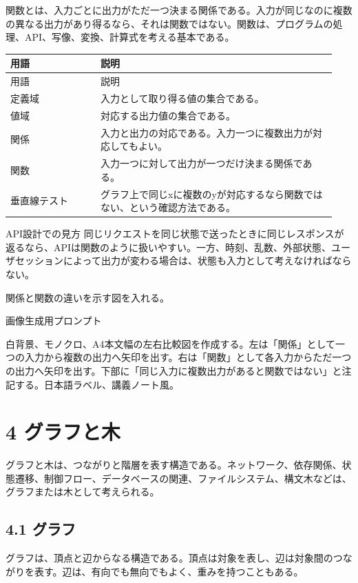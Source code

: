 \documentclass[uplatex,dvipdfmx,a4paper,10pt]{jsarticle}
\begin{document}
関数とは、入力ごとに出力がただ一つ決まる関係である。入力が同じなのに複数の異なる出力があり得るなら、それは関数ではない。関数は、プログラムの処理、API、写像、変換、計算式を考える基本である。

\begin{longtable}{>{\raggedright\arraybackslash}p{0.26\linewidth} >{\raggedright\arraybackslash}p{0.68\linewidth}}
\toprule
用語 & 説明 \\
\midrule
\endfirsthead
\toprule
用語 & 説明 \\
\midrule
\endhead
定義域 & 入力として取り得る値の集合である。 \\
値域 & 対応する出力値の集合である。 \\
関係 & 入力と出力の対応である。入力一つに複数出力が対応してもよい。 \\
関数 & 入力一つに対して出力が一つだけ決まる関係である。 \\
垂直線テスト & グラフ上で同じxに複数のyが対応するなら関数ではない、という確認方法である。 \\
\bottomrule
\end{longtable}
\begin{infobox}{API設計での見方}
同じリクエストを同じ状態で送ったときに同じレスポンスが返るなら、APIは関数のように扱いやすい。一方、時刻、乱数、外部状態、ユーザセッションによって出力が変わる場合は、状態も入力として考えなければならない。
\end{infobox}
\begin{todobox}
関係と関数の違いを示す図を入れる。

画像生成用プロンプト

白背景、モノクロ、A4本文幅の左右比較図を作成する。左は「関係」として一つの入力から複数の出力へ矢印を出す。右は「関数」として各入力からただ一つの出力へ矢印を出す。下部に「同じ入力に複数出力があると関数ではない」と注記する。日本語ラベル、講義ノート風。
\end{todobox}
\section{4 グラフと木}
グラフと木は、つながりと階層を表す構造である。ネットワーク、依存関係、状態遷移、制御フロー、データベースの関連、ファイルシステム、構文木などは、グラフまたは木として考えられる。

\subsection{4.1 グラフ}
グラフは、頂点と辺からなる構造である。頂点は対象を表し、辺は対象間のつながりを表す。辺は、有向でも無向でもよく、重みを持つこともある。
\end{document}
